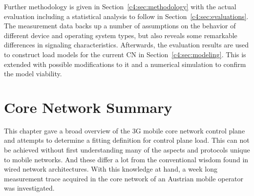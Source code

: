 Further methodology is given in Section~\ref{c4:sec:methodology} with the actual evaluation including a statistical analysis to follow in Section~\ref{c4:sec:evaluations}. The measurement data backs up a number of assumptions on the behavior of different device and operating system types, but also reveals some remarkable differences in signaling characteristics. Afterwards, the evaluation results are used to construct load models for the current \gls{CN} in Section~\ref{c4:sec:modeling}. This is extended with possible modifications to it and a numerical simulation to confirm the model viability.

























\section{Core Network Summary}
\label{c4:sec:conclusion}

This chapter gave a broad overview of the \gls{3G} mobile core network control plane and attempts to determine a fitting definition for control plane load. This can not be achieved without first understanding many of the aspects and protocols unique to mobile networks. And these differ a lot from the conventional wisdom found in wired network architectures. With this knowledge at hand, a week long measurement trace acquired in the core network of an Austrian mobile operator was investigated. 

